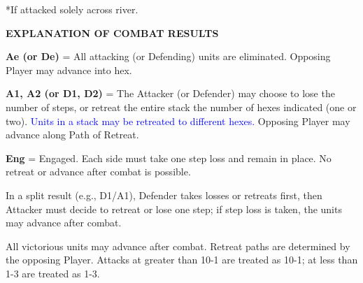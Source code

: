 \begin{strip}
  \medskip
  *If attacked solely across river.

  \bigskip

\end{strip}

\begin{flushleft}
  \textbf{EXPLANATION OF COMBAT RESULTS}
\end{flushleft}

\textbf{Ae (or De)} = All attacking (or Defending) units are eliminated. Opposing Player may advance into hex.
\par
\textbf{A1, A2 (or D1, D2)} = The Attacker (or Defender) may choose to lose the number of steps, or retreat the entire stack the number of hexes indicated (one or two). \textcolor{blue}{Units in a stack may be retreated to different hexes.} Opposing Player may advance along Path of Retreat.
\par
\textbf{Eng} = Engaged. Each side must take one step loss and remain in place. No retreat or advance after combat is possible.
\par
In a split result (e.g., D1/A1), Defender takes losses or retreats first, then Attacker must decide to retreat or lose one step; if step loss is taken, the units may advance after combat.
\par
All victorious units may advance after combat. Retreat paths are determined by the opposing Player. Attacks at greater than 10-1 are treated as 10-1; at less than 1-3 are treated as 1-3.
